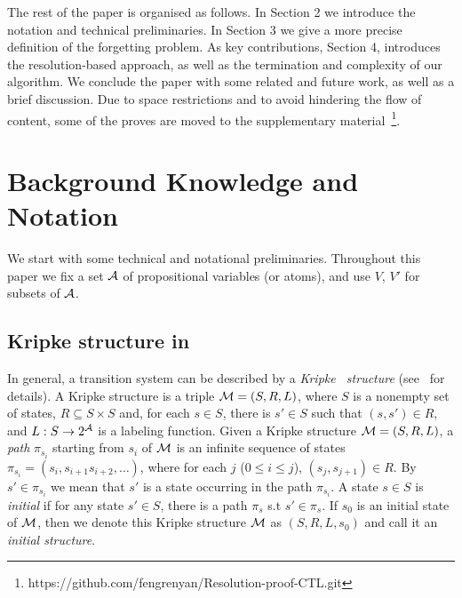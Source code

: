 \documentclass[letterpaper]{article} %
\begin{document}
The rest of the paper is organised as follows. %
In Section 2  we introduce the notation and technical preliminaries.
In Section 3 we give a more precise definition of the forgetting problem.
As key contributions, Section 4, introduces the resolution-based approach, as well as the termination and complexity of our algorithm.
We conclude the paper with some related and future work, as well as a brief discussion. Due to space restrictions and to avoid hindering the flow of content, some of the proves are moved to the supplementary material~\footnote{https://github.com/fengrenyan/Resolution-proof-CTL.git}.




\section{Background Knowledge and Notation} \label{preliminaries}
We start with some technical and notational preliminaries. Throughout this paper we fix a set ${\cal A}$ of propositional variables (or atoms), and use $V$, $V'$ for subsets of ${\cal A}$.
\subsection{Kripke structure in \CTL}
 In general, a transition system
 can be described by a  \emph{Kripke \ structure} (see~\cite{Baier:PMC:2008} for details). A Kripke structure is a triple ${\cal M}=(S,R,L)$, where
  $S$ is a nonempty set of states, %
 $R\subseteq S\times S$ and, for each $s\in S$, there
  is $s'\in S$ such that $(s,s')\in R$,
and $L: S\rightarrow 2^{\cal A}$ is a labeling function.
Given a Kripke structure ${\cal M}=(S,R,L)$, a \emph{path} $\pi_{s_i}$ starting from $s_i$ of ${\cal M}$ is an infinite sequence of states $\pi_{s_i}=(s_i, s_{i+1} s_{i+2},\dots)$, where for each $j$ ($0\leq i\leq j$), $(s_j, s_{j+1}) \in R$. By $s'\in \pi_{s_i}$ we mean that $s'$ is a state  occurring in the path $\pi_{s_i}$.
A state $s\in S$ is {\em initial} if for any state $s'\in S$, there is a path $\pi_s$ s.t $s'\in \pi_s$.
If $s_0$ is an initial state of ${\cal M}$, then we denote this Kripke structure ${\cal M}$ as $(S,R,L,s_0)$ and call it an \emph{initial structure}.
\end{document}
